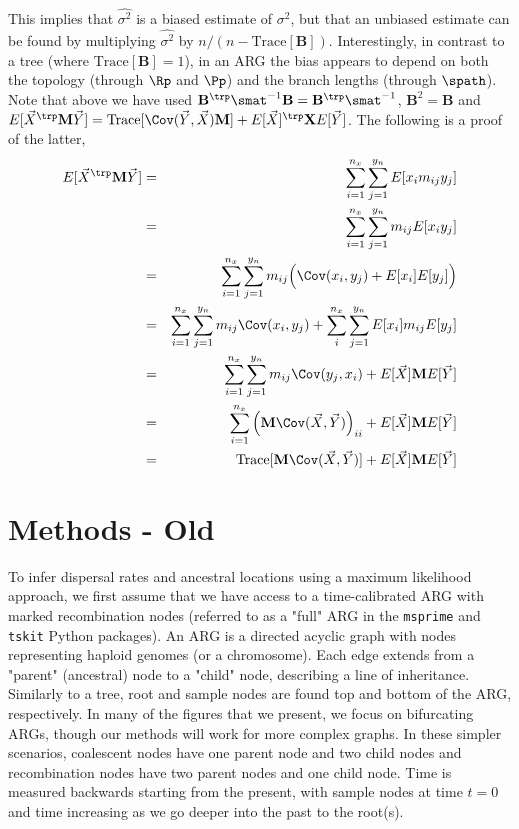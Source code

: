 This implies that $\widehat{\sigma^2}$ is a biased estimate of $\sigma^2$, but that an unbiased estimate can be found by multiplying $\widehat{\sigma^2}$ by $n/(n-\text{Trace}[\mathbf{B}])$. Interestingly, in contrast to a tree (where $\text{Trace}[\mathbf{B}]=1$), in an ARG the bias appears to depend on both the topology (through $\Rp$ and $\Pp$) and the branch lengths (through $\spath$).
Note that above we have used $\mathbf{B}^\trp \smat^{-1} \mathbf{B} = \mathbf{B}^\trp\smat^{-1}$, $\mathbf{B}^2 = \mathbf{B}$ and $E[\vec{X}^\trp \mathbf{M} \vec{Y} ] = \text{Trace}[\Cov(\vec{Y},\vec{X})\mathbf{M}] + E[\vec{X}]^\trp\mathbf{X}E[\vec{Y}] $. The following is a proof of the latter,
\begin{eqnarray}
    E[\vec{X}^\trp \mathbf{M} \vec{Y} ] &=& \sum_{i=1}^{n_x} \sum_{j = 1}^{y_n} E[x_im_{ij}y_j] \\
    &=& \sum_{i=1}^{n_x} \sum_{j = 1}^{y_n} m_{ij}E[x_iy_j] \\
    &=& \sum_{i=1}^{n_x} \sum_{j = 1}^{y_n} m_{ij}\Big( \Cov(x_i,y_j) + E[x_i]E[y_j]\Big) \\
    &=& \sum_{i=1}^{n_x} \sum_{j = 1}^{y_n} m_{ij} \Cov(x_i,y_j) + \sum_{i}^{n_x} \sum_{j = 1}^{y_n} E[x_i]m_{ij}E[y_j] \\
    &=& \sum_{i=1}^{n_x} \sum_{j = 1}^{y_n} m_{ij} \Cov(y_j,x_i) + E[\vec{X}] \mathbf{M} E[\vec{Y }] \\
    &=& \sum_{i=1}^{n_x} \Big(\mathbf{M}\Cov(\vec{X},\vec{Y})\Big)_{ii}+ E[\vec{X}] \mathbf{M} E[\vec{Y }] \\
    &=& \text{Trace}[\mathbf{M}\Cov(\vec{X},\vec{Y})] + E[\vec{X}] \mathbf{M} E[\vec{Y }]
\end{eqnarray}


\section{Methods - Old}

To infer dispersal rates and ancestral locations using a maximum likelihood approach, we first assume that we have access to a time-calibrated ARG with marked recombination nodes (referred to as a "full" ARG in the {\tt msprime} and {\tt tskit} Python packages). An ARG is a directed acyclic graph with nodes representing haploid genomes (or a chromosome). Each edge extends from a "parent" (ancestral) node to a "child" node, describing a line of inheritance. Similarly to a tree, root and sample nodes are found top and bottom of the ARG, respectively. In many of the figures that we present, we focus on bifurcating ARGs, though our methods will work for more complex graphs. In these simpler scenarios, coalescent nodes have one parent node and two child nodes and recombination nodes have two parent nodes and one child node. Time is measured backwards starting from the present, with sample nodes at time $t=0$ and time increasing as we go deeper into the past to the root(s).

